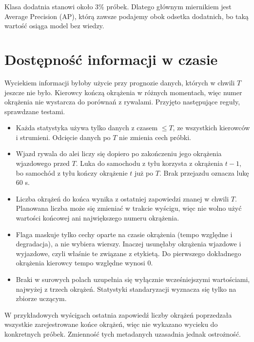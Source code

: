 Klasa dodatnia stanowi około 3\% próbek. Dlatego głównym miernikiem jest
Average Precision (AP), którą zawsze podajemy obok odsetka dodatnich,
bo taką wartość osiąga model bez wiedzy.

\section{Dostępność informacji w czasie}

Wyciekiem informacji byłoby użycie przy prognozie danych, których w chwili
$T$ jeszcze nie było. Kierowcy kończą okrążenia w różnych momentach, więc
numer okrążenia nie wystarcza do porównań z rywalami. Przyjęto następujące
reguły, sprawdzane testami.

\begin{itemize}
\item Każda statystyka używa tylko danych z czasem $\leq T$, ze wszystkich
kierowców i strumieni. Odcięcie danych po $T$ nie zmienia cech próbki.
\item Wjazd rywala do alei liczy się dopiero po zakończeniu jego okrążenia
wjazdowego przed $T$. Luka do samochodu z tyłu korzysta z okrążenia $t-1$,
bo samochód z tyłu kończy okrążenie $t$ już po $T$. Brak przejazdu oznacza
lukę 60 s.
\item Liczba okrążeń do końca wynika z ostatniej zapowiedzi znanej w chwili
$T$. Planowana liczba może się zmieniać w trakcie wyścigu, więc nie wolno
użyć wartości końcowej ani największego numeru okrążenia.
\item Flaga  maskuje tylko cechy oparte na czasie okrążenia
(tempo względne i degradacja), a nie wybiera wierszy. Inaczej usunęłaby
okrążenia wjazdowe i wyjazdowe, czyli właśnie te związane z etykietą.
Do pierwszego dokładnego okrążenia kierowcy tempo względne wynosi 0.
\item Braki w surowych polach uzupełnia się wyłącznie wcześniejszymi
wartościami, najwyżej z trzech okrążeń. Statystyki standaryzacji wyznacza się
tylko na zbiorze uczącym.
\end{itemize}

W przykładowych wyścigach ostatnia zapowiedź liczby okrążeń poprzedzała
wszystkie zarejestrowane końce okrążeń, więc nie wykazano wycieku do
konkretnych próbek. Zmienność tych metadanych uzasadnia jednak ostrożność.
